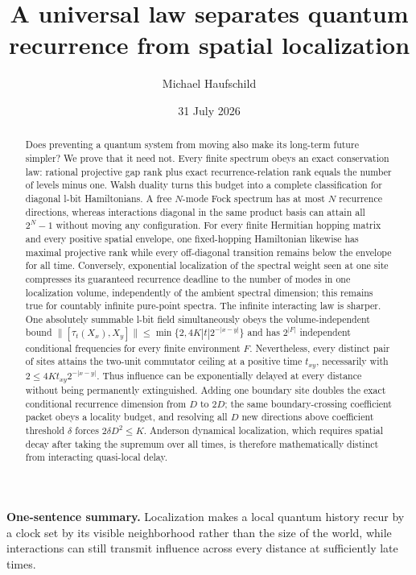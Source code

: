 \documentclass[10pt]{article}
\title{\textbf{A universal law separates quantum recurrence
from spatial localization}}
\author{Michael Haufschild}
\date{31 July 2026}
\theoremstyle{definition}
\begin{document}
\maketitle

\begin{abstract}
Does preventing a quantum system from moving also make its long-term future
simpler? We prove that it need not. Every finite spectrum obeys an exact
conservation law: rational projective gap rank plus exact recurrence-relation
rank equals the number of levels minus one. Walsh duality turns this budget
into a complete classification for diagonal l-bit Hamiltonians. A free
\(N\)-mode Fock spectrum has at most \(N\) recurrence directions, whereas
interactions diagonal in the same product basis can attain all \(2^N-1\)
without moving any configuration. For every finite Hermitian hopping matrix
and every positive spatial envelope, one fixed-hopping Hamiltonian likewise
has maximal projective rank while every off-diagonal transition remains
below the envelope for all time. Conversely, exponential localization of
the spectral weight seen at one site compresses its guaranteed recurrence
deadline to the number of modes in one localization volume, independently
of the ambient spectral dimension; this remains true for countably infinite
pure-point spectra. The infinite interacting law is sharper. One
absolutely summable l-bit field simultaneously obeys the volume-independent
bound
\(\|[\tau_t(X_x),X_y]\|\le\min\{2,4K|t|2^{-|x-y|}\}\)
and has \(2^{|F|}\) independent conditional frequencies for every finite
environment \(F\). Nevertheless, every distinct pair of sites attains the
two-unit commutator ceiling at a positive time \(t_{xy}\), necessarily with
\(2\le4Kt_{xy}2^{-|x-y|}\). Thus influence can be exponentially delayed at
every distance without being permanently extinguished. Adding one boundary
site doubles the exact conditional recurrence dimension from \(D\) to
\(2D\); the same boundary-crossing coefficient packet obeys a locality
budget, and resolving all \(D\) new directions above coefficient threshold
\(\delta\) forces \(2\delta D^2\le K\). Anderson dynamical localization,
which requires spatial decay after taking the supremum over all times, is
therefore mathematically distinct from interacting quasi-local delay.
\end{abstract}

\noindent\textbf{One-sentence summary.}
Localization makes a local quantum history recur by a clock set by its
visible neighborhood rather than the size of the world, while interactions
can still transmit influence across every distance at sufficiently late
times.
\end{document}
